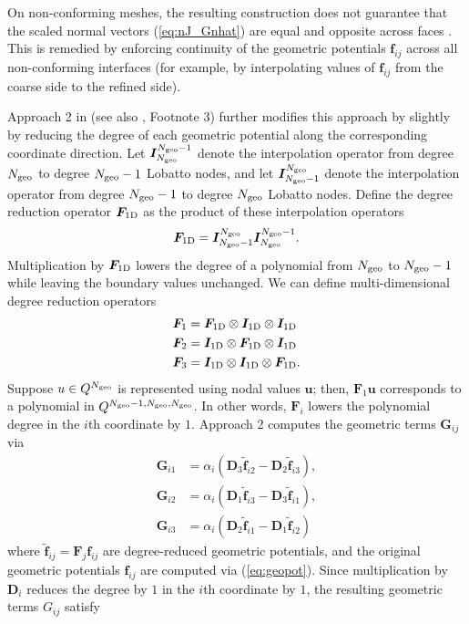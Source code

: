 \documentclass{svjour3}                     %
\renewcommand{\tilde}{\widetilde}
\newcommand{\LRp}[1]{\left( #1 \right)}
\begin{document}
On non-conforming meshes, the resulting construction does not guarantee that the scaled normal vectors (\ref{eq:nJ_Gnhat}) are equal and opposite across faces \cite{kopriva2019free}.  This is remedied by enforcing continuity of the geometric potentials $\bm{f}_{ij}$ across all non-conforming interfaces (for example, by interpolating values of $\bm{f}_{ij}$ from the coarse side to the refined side).  

Approach 2 in \cite{kozdon2018energy} (see also \cite{chan2019skew}, Footnote 3) further modifies this approach by slightly by reducing the degree of each geometric potential along the corresponding coordinate direction.  Let $\bm{I}_{N_{\rm geo}}^{N_{\rm geo}-1}$ denote the interpolation operator from degree $N_{\rm geo}$ to degree $N_{\rm geo}-1$ Lobatto nodes, and let $\bm{I}_{N_{\rm geo}-1}^{N_{\rm geo}}$ denote the interpolation operator from degree $N_{\rm geo}-1$ to degree $N_{\rm geo}$ Lobatto nodes.  Define the degree reduction operator $\bm{F}_{\rm 1D}$ as the product of these interpolation operators
\[
\bm{F}_{\rm 1D} = \bm{I}_{N_{\rm geo}-1}^{N_{\rm geo}}\bm{I}_{N_{\rm geo}}^{N_{\rm geo}-1}.
\]
Multiplication by $\bm{F}_{\rm 1D}$ lowers the degree of a polynomial from $N_{\rm geo}$ to $N_{\rm geo}-1$ while leaving the boundary values unchanged.  We can define multi-dimensional degree reduction operators 
\begin{align*}
\bm{F}_1 &= \bm{F}_{\rm 1D} \otimes \bm{I}_{\rm 1D}\otimes \bm{I}_{\rm 1D}\\
\bm{F}_2 &= \bm{I}_{\rm 1D} \otimes \bm{F}_{\rm 1D}\otimes \bm{I}_{\rm 1D}\\
\bm{F}_3 &= \bm{I}_{\rm 1D} \otimes \bm{I}_{\rm 1D}\otimes \bm{F}_{\rm 1D}.
\end{align*}
Suppose $u \in Q^{N_{\rm geo}}$ is represented using nodal values $\bm{u}$; then, $\bm{F}_1\bm{u}$ corresponds to a polynomial in $Q^{N_{\rm geo}-1,N_{\rm geo},N_{\rm geo}}$.  In other words, $\bm{F}_i$ lowers the polynomial degree in the $i$th coordinate by $1$.  Approach 2 computes the geometric terms $\bm{G}_{ij}$ via
\begin{align*}
\bm{G}_{i1} &= \alpha_i\LRp{\bm{D}_3\tilde{\bm{f}}_{i2} - \bm{D}_2\tilde{\bm{f}}_{i3}},\\
\bm{G}_{i2} &=\alpha_i \LRp{\bm{D}_1\tilde{\bm{f}}_{i3} - \bm{D}_3\tilde{\bm{f}}_{i1}},\\
\bm{G}_{i3} &= \alpha_i\LRp{\bm{D}_2\tilde{\bm{f}}_{i1} - \bm{D}_1\tilde{\bm{f}}_{i2}}
\end{align*}
where $\tilde{\bm{f}}_{ij} = \bm{F}_j \bm{f}_{ij}$ are degree-reduced geometric potentials, and the original geometric potentials $\bm{f}_{ij}$ are computed via (\ref{eq:geopot}).  Since multiplication by $\bm{D}_i$ reduces the degree by $1$ in the $i$th coordinate by $1$, the resulting geometric terms $G_{ij}$ satisfy
\end{document}
